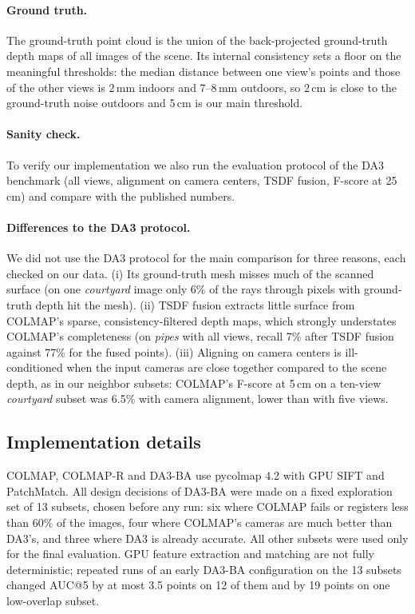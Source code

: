 \documentclass[10pt,twocolumn,letterpaper]{article}
\begin{document}
\paragraph{Ground truth.}
The ground-truth point cloud is the union of the back-projected ground-truth depth maps of all images of the
scene. Its internal consistency sets a floor on the meaningful thresholds: the median distance between one
view's points and those of the other views is 2\,mm indoors and 7--8\,mm outdoors, so 2\,cm is close to the
ground-truth noise outdoors and 5\,cm is our main threshold.

\paragraph{Sanity check.}
To verify our implementation we also run the evaluation protocol of the DA3 benchmark (all views, alignment on
camera centers, TSDF fusion, F-score at 25\,cm) and compare with the published numbers.

\paragraph{Differences to the DA3 protocol.}
We did not use the DA3 protocol for the main comparison for three reasons, each checked on our data.
(i) Its ground-truth mesh misses much of the scanned surface (on one \emph{courtyard} image only 6\% of the rays
through pixels with ground-truth depth hit the mesh). (ii) TSDF fusion extracts little surface from COLMAP's
sparse, consistency-filtered depth maps, which strongly understates COLMAP's completeness (on \emph{pipes} with
all views, recall 7\% after TSDF fusion against 77\% for the fused points). (iii) Aligning on camera centers is
ill-conditioned when the input cameras are close together compared to the scene depth, as in our neighbor
subsets: COLMAP's F-score at 5\,cm on a ten-view \emph{courtyard} subset was 6.5\% with camera alignment, lower
than with five views.

\subsection{Implementation details}

COLMAP, COLMAP-R and DA3-BA use pycolmap 4.2 with GPU SIFT and PatchMatch. All design decisions of DA3-BA were
made on a fixed exploration set of 13 subsets, chosen before any run: six where COLMAP fails or registers less
than 60\% of the images, four where COLMAP's cameras are much better than DA3's, and three where DA3 is
already accurate. All other subsets were used only for the final evaluation. GPU feature extraction and matching
are not fully deterministic; repeated runs of an early DA3-BA configuration on the 13 subsets changed AUC@5 by at most 3.5 points on 12
of them and by 19 points on one low-overlap subset.
\end{document}
